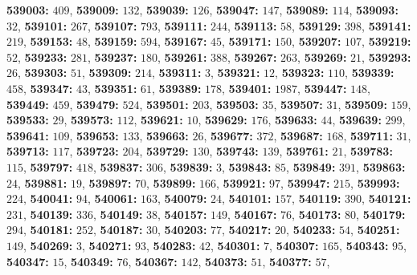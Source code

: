\textsf{\bfseries 539003:} $409$, \textsf{\bfseries 539009:} $132$, \textsf{\bfseries 539039:} $126$, \textsf{\bfseries 539047:} $147$, \textsf{\bfseries 539089:} $114$, \textsf{\bfseries 539093:} $32$, \textsf{\bfseries 539101:} $267$, \textsf{\bfseries 539107:} $793$, \textsf{\bfseries 539111:} $244$, \textsf{\bfseries 539113:} $58$, \textsf{\bfseries 539129:} $398$, \textsf{\bfseries 539141:} $219$, \textsf{\bfseries 539153:} $48$, \textsf{\bfseries 539159:} $594$, \textsf{\bfseries 539167:} $45$, \textsf{\bfseries 539171:} $150$, \textsf{\bfseries 539207:} $107$, \textsf{\bfseries 539219:} $52$, \textsf{\bfseries 539233:} $281$, \textsf{\bfseries 539237:} $180$, \textsf{\bfseries 539261:} $388$, \textsf{\bfseries 539267:} $263$, \textsf{\bfseries 539269:} $21$, \textsf{\bfseries 539293:} $26$, \textsf{\bfseries 539303:} $51$, \textsf{\bfseries 539309:} $214$, \textsf{\bfseries 539311:} $3$, \textsf{\bfseries 539321:} $12$, \textsf{\bfseries 539323:} $110$, \textsf{\bfseries 539339:} $458$, \textsf{\bfseries 539347:} $43$, \textsf{\bfseries 539351:} $61$, \textsf{\bfseries 539389:} $178$, \textsf{\bfseries 539401:} $1987$, \textsf{\bfseries 539447:} $148$, \textsf{\bfseries 539449:} $459$, \textsf{\bfseries 539479:} $524$, \textsf{\bfseries 539501:} $203$, \textsf{\bfseries 539503:} $35$, \textsf{\bfseries 539507:} $31$, \textsf{\bfseries 539509:} $159$, \textsf{\bfseries 539533:} $29$, \textsf{\bfseries 539573:} $112$, \textsf{\bfseries 539621:} $10$, \textsf{\bfseries 539629:} $176$, \textsf{\bfseries 539633:} $44$, \textsf{\bfseries 539639:} $299$, \textsf{\bfseries 539641:} $109$, \textsf{\bfseries 539653:} $133$, \textsf{\bfseries 539663:} $26$, \textsf{\bfseries 539677:} $372$, \textsf{\bfseries 539687:} $168$, \textsf{\bfseries 539711:} $31$, \textsf{\bfseries 539713:} $117$, \textsf{\bfseries 539723:} $204$, \textsf{\bfseries 539729:} $130$, \textsf{\bfseries 539743:} $139$, \textsf{\bfseries 539761:} $21$, \textsf{\bfseries 539783:} $115$, \textsf{\bfseries 539797:} $418$, \textsf{\bfseries 539837:} $306$, \textsf{\bfseries 539839:} $3$, \textsf{\bfseries 539843:} $85$, \textsf{\bfseries 539849:} $391$, \textsf{\bfseries 539863:} $24$, \textsf{\bfseries 539881:} $19$, \textsf{\bfseries 539897:} $70$, \textsf{\bfseries 539899:} $166$, \textsf{\bfseries 539921:} $97$, \textsf{\bfseries 539947:} $215$, \textsf{\bfseries 539993:} $224$, \textsf{\bfseries 540041:} $94$, \textsf{\bfseries 540061:} $163$, \textsf{\bfseries 540079:} $24$, \textsf{\bfseries 540101:} $157$, \textsf{\bfseries 540119:} $390$, \textsf{\bfseries 540121:} $231$, \textsf{\bfseries 540139:} $336$, \textsf{\bfseries 540149:} $38$, \textsf{\bfseries 540157:} $149$, \textsf{\bfseries 540167:} $76$, \textsf{\bfseries 540173:} $80$, \textsf{\bfseries 540179:} $294$, \textsf{\bfseries 540181:} $252$, \textsf{\bfseries 540187:} $30$, \textsf{\bfseries 540203:} $77$, \textsf{\bfseries 540217:} $20$, \textsf{\bfseries 540233:} $54$, \textsf{\bfseries 540251:} $149$, \textsf{\bfseries 540269:} $3$, \textsf{\bfseries 540271:} $93$, \textsf{\bfseries 540283:} $42$, \textsf{\bfseries 540301:} $7$, \textsf{\bfseries 540307:} $165$, \textsf{\bfseries 540343:} $95$, \textsf{\bfseries 540347:} $15$, \textsf{\bfseries 540349:} $76$, \textsf{\bfseries 540367:} $142$, \textsf{\bfseries 540373:} $51$, \textsf{\bfseries 540377:} $57$, 
